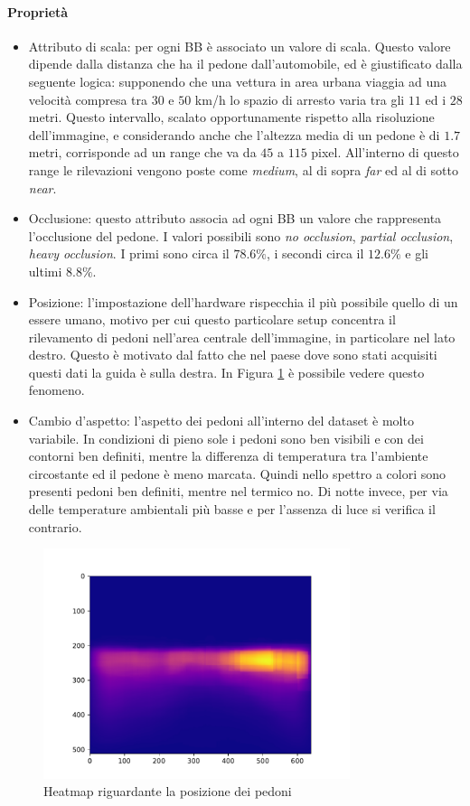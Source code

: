 \paragraph{Propriet\`{a}}
\begin{itemize}
    \item Attributo di scala: per ogni \ac{BB} è associato un valore di scala. Questo valore dipende dalla distanza che ha il pedone dall'automobile, ed è giustificato dalla seguente logica: supponendo che una vettura in area urbana viaggia ad una velocità compresa tra $30$ e $50$ km/h lo spazio di arresto varia tra gli $11$ ed i $28$ metri. Questo intervallo, scalato opportunamente rispetto alla risoluzione dell'immagine, e considerando anche che l'altezza media di un pedone è di $1.7$ metri, corrisponde ad un range che va da $45$ a $115$ pixel. All'interno di questo range le rilevazioni vengono poste come \textit{medium}, al di sopra \textit{far} ed al di sotto \textit{near}.
    \item Occlusione: questo attributo associa ad ogni \ac{BB} un valore che rappresenta l'occlusione del pedone. I valori possibili sono \textit{no occlusion}, \textit{partial occlusion}, \textit{heavy occlusion}. I primi sono circa il $78.6\%$, i secondi circa il $12.6\%$ e gli ultimi $8.8\%$.
    \item Posizione: l'impostazione dell'hardware rispecchia il più possibile quello di un essere umano, motivo per cui questo particolare setup concentra il rilevamento di pedoni nell'area centrale dell'immagine, in particolare nel lato destro. Questo è motivato dal fatto che nel paese dove sono stati acquisiti questi dati la guida è sulla destra. In Figura \ref{fig:heatmap} è possibile vedere questo fenomeno.
    \item Cambio d'aspetto: l'aspetto dei pedoni all'interno del dataset è molto variabile. In condizioni di pieno sole i pedoni sono ben visibili e con dei contorni ben definiti, mentre la differenza di temperatura tra l'ambiente circostante ed il pedone è meno marcata. Quindi nello spettro a colori sono presenti pedoni ben definiti, mentre nel termico no. Di notte invece, per via delle temperature ambientali più basse e per l'assenza di luce si verifica il contrario.
\end{itemize}
\begin{figure}
    \centering
    \includegraphics[width=0.8\textwidth]{images/graphic/heatmap.pdf}
    \caption{Heatmap riguardante la posizione dei pedoni}
    \label{fig:heatmap}
\end{figure}
